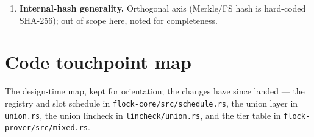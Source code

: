 \documentclass[11pt]{article}
\newcommand{\code}[1]{\texttt{#1}}
\theoremstyle{definition}
\begin{document}
\begin{enumerate}[nosep]
        additional sumchecks over committed columns) enforces that every
        consumed tuple was emitted; public values enter as statement-side
        injections into the bus. This integrates at claim level --- the
        bus sumchecks emit evaluation claims into the same transport batch
        --- so the multi-table core needs nothing from it beyond what
        already holds (fixed column offsets per type, cheap per-slot
        claims). It changes no decision in this document and deserves its
        own design document.
  \item \textbf{Internal-hash generality.} Orthogonal axis (Merkle/FS hash
        is hard-coded SHA-256); out of scope here, noted for completeness.
\end{enumerate}

\appendix
\section{Code touchpoint map}\label{app:code}

The design-time map, kept for orientation; the changes have since landed
--- the registry and slot schedule in \code{flock-core/src/schedule.rs},
the union layer in \code{union.rs}, the union lincheck in
\code{lincheck/union.rs}, and the tier table in
\code{flock-prover/src/mixed.rs}.
\end{document}
